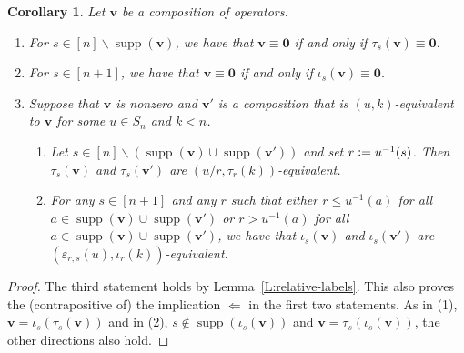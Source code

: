 \documentclass[12pt,oneside,reqno]{amsart}
\newtheorem{corollary}[theorem]{Corollary}
\theoremstyle{definition}
\numberwithin{equation}{section}
\newcommand{\qv}{{\mathbf v}}
\newcommand{\bzero}{{\mathbf 0}}
\DeclareMathOperator{\supp}{supp}
\begin{document}
\begin{corollary}\label{C:single_equivalences}
  Let $\qv$ be a composition of operators.
  \begin{enumerate}[label=(\arabic*)]
    
  \item \label{C:SE_1}
    For $s\in[n]\smallsetminus\supp(\qv)$, we have that $\qv\equiv\bzero$ if and only if $\tau_s(\qv)\equiv\bzero$.

  \item
    For $s\in[n{+}1]$, we have that $\qv\equiv\bzero$ if and only if $\iota_s(\qv)\equiv\bzero$.

  \item  \label{C:SE_3}
    Suppose that $\qv$ is nonzero and $\qv'$ is a composition that is $(u,k)$-equivalent to $\qv$ for some $u\in S_n$ and $k<n$. 
    
        \begin{enumerate}[label=(\roman*)]
        \item  \label{C:SE_3_i}
          Let $s\in[n]\smallsetminus(\supp(\qv)\cup\supp(\qv'))$ and set $r\vcentcolon= u^{-1}(s)$.
          Then $\tau_s(\qv)$ and $\tau_s(\qv')$ are $(u/r,\tau_r(k))$-equivalent.

        \item
          For any $s\in[n{+}1]$ and any $r$ such that either $r\leq u^{-1}(a)$ for all $a\in\supp(\qv)\cup\supp(\qv')$ or
          $r>u^{-1}(a)$ for all $a\in\supp(\qv)\cup\supp(\qv')$, we have that 
          $\iota_s(\qv)$ and $\iota_s(\qv')$ are $(\varepsilon_{r,s}(u), \iota_r(k))$-equivalent.

        \end{enumerate}   
  \end{enumerate}
\end{corollary}

\begin{proof}
  The third statement holds by Lemma~\ref{L:relative-labels}.
  This also proves the (contrapositive of) the implication $\Leftarrow$ in the first two statements.
  As in (1), $\qv=\iota_s(\tau_s(\qv))$ and in (2), $s\not\in\supp(\iota_s(\qv))$ and $\qv=\tau_s(\iota_s(\qv))$, the other
  directions also hold.  
\end{proof}
\end{document}
